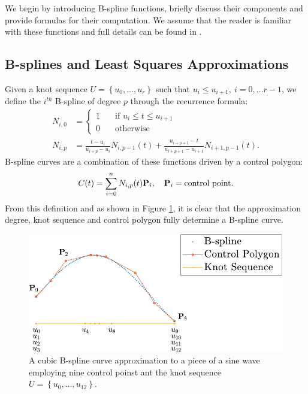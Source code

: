 We begin by introducing B-spline functions, briefly discuss their components and provide formulas for their 
computation. We assume that the reader is familiar with these functions and full details can be found in 
 \cite{nurbs_book, deboor2001practical, schumaker2015spline}. 
  \subsection*{B-splines and Least Squares Approximations}
 Given a knot sequence $U=\left\{u_0,\ldots,u_r\right\}$ such that $u_i\leq u_{i+1},\  i=0,\ldots r-1$, we define 
 the $i^{th}$ B-spline of degree $p$ through the recurrence formula:
 \begin{align}
 N_{i,0} &= \left\{ \begin{aligned}
                    1 \quad &\text{if } u_i\leq t\leq u_{i+1}\\
                    0 \quad &\text{otherwise }
                   \end{aligned}\right. \\
N_{i,p} &= \frac{t - u_i}{u_{i+p} - u_i}N_{i,p-1}(t) +  \frac{u_{i+p+1} - t}{u_{i+p+1} - u_{i+1}}N_{i+1,p-1}(t).
 \end{align}
 B-spline curves are a combination of these functions driven by a control polygon:
 \begin{equation}
  C(t) = \sum_{i=0}^n N_{i,p}(t) \textbf P_i, \quad  \textbf P_i = \text{control point}.
 \end{equation}
From this definition and as shown in Figure \ref{fig:bspline_sine}, 
it is clear that the approximation degree, 
knot sequence and control polygon fully determine a B-spline curve.
 
\begin{figure}
 \centering
 \includegraphics[width =\textwidth]{sinePlot/sineBspline-crop}
 \caption{\label{fig:bspline_sine} A cubic B-spline curve approximation to a piece of a sine wave employing nine
 control poinst ant the knot sequence 
 $U=\left\{u_0,\dots,u_{12}\right\}$.}
\end{figure}


